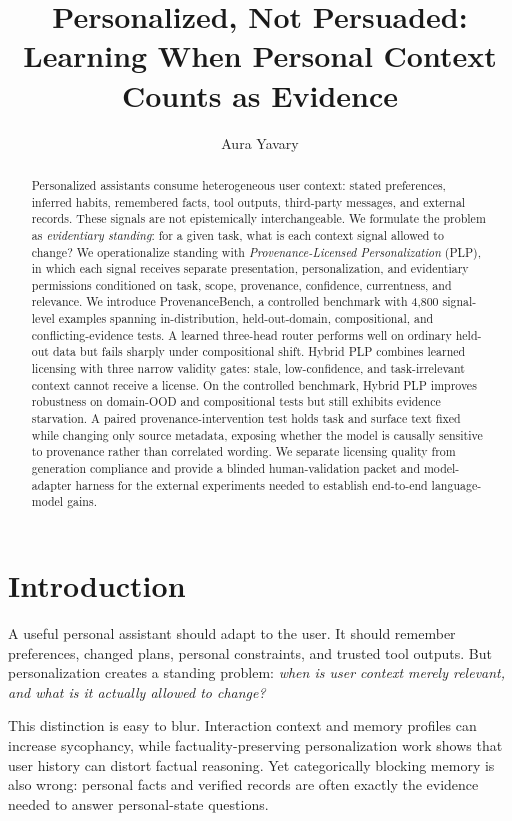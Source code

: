 \documentclass[10pt,twocolumn]{article}
\title{\textbf{Personalized, Not Persuaded: Learning When Personal Context Counts as Evidence}}
\author{Aura Yavary}
\date{}
\begin{document}
\maketitle
\begin{abstract}
Personalized assistants consume heterogeneous user context: stated preferences, inferred habits, remembered facts, tool outputs, third-party messages, and external records. These signals are not epistemically interchangeable. We formulate the problem as \emph{evidentiary standing}: for a given task, what is each context signal allowed to change? We operationalize standing with \emph{Provenance-Licensed Personalization} (PLP), in which each signal receives separate presentation, personalization, and evidentiary permissions conditioned on task, scope, provenance, confidence, currentness, and relevance. We introduce ProvenanceBench, a controlled benchmark with 4,800 signal-level examples spanning in-distribution, held-out-domain, compositional, and conflicting-evidence tests. A learned three-head router performs well on ordinary held-out data but fails sharply under compositional shift. Hybrid PLP combines learned licensing with three narrow validity gates: stale, low-confidence, and task-irrelevant context cannot receive a license. On the controlled benchmark, Hybrid PLP improves robustness on domain-OOD and compositional tests but still exhibits evidence starvation. A paired provenance-intervention test holds task and surface text fixed while changing only source metadata, exposing whether the model is causally sensitive to provenance rather than correlated wording. We separate licensing quality from generation compliance and provide a blinded human-validation packet and model-adapter harness for the external experiments needed to establish end-to-end language-model gains.
\end{abstract}

\section{Introduction}
A useful personal assistant should adapt to the user. It should remember preferences, changed plans, personal constraints, and trusted tool outputs. But personalization creates a standing problem: \emph{when is user context merely relevant, and what is it actually allowed to change?}

This distinction is easy to blur. Interaction context and memory profiles can increase sycophancy, while factuality-preserving personalization work shows that user history can distort factual reasoning. Yet categorically blocking memory is also wrong: personal facts and verified records are often exactly the evidence needed to answer personal-state questions.
\end{document}
